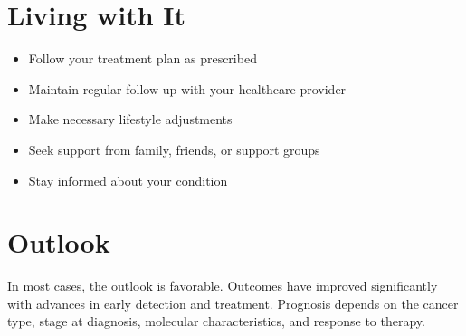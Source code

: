 \section{Living with It}
\begin{itemize}[noitemsep]
  \item Follow your treatment plan as prescribed
  \item Maintain regular follow-up with your healthcare provider
  \item Make necessary lifestyle adjustments
  \item Seek support from family, friends, or support groups
  \item Stay informed about your condition
\end{itemize}
\section{Outlook}
In most cases, the outlook is favorable. Outcomes have improved significantly with advances in early detection and treatment. Prognosis depends on the cancer type, stage at diagnosis, molecular characteristics, and response to therapy.
